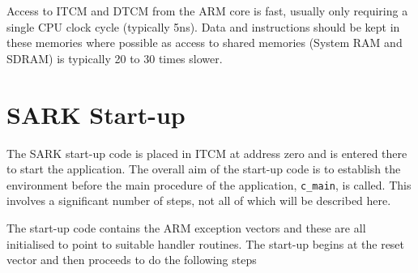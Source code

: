 Access to ITCM and DTCM from the ARM core is fast, usually only
requiring a single CPU clock cycle (typically 5ns). Data and
instructions should be kept in these memories where possible as access
to shared memories (System RAM and SDRAM) is typically 20 to 30 times
slower.

\section{SARK Start-up}

The SARK start-up code is placed in ITCM at address zero and is
entered there to start the application. The overall aim of the
start-up code is to establish the environment before the main
procedure of the application, \texttt{c\_main}, is called. This involves a
significant number of steps, not all of which will be described here.

The start-up code contains the ARM exception vectors and these are all
initialised to point to suitable handler routines. The start-up begins
at the reset vector and then proceeds to do the following steps

